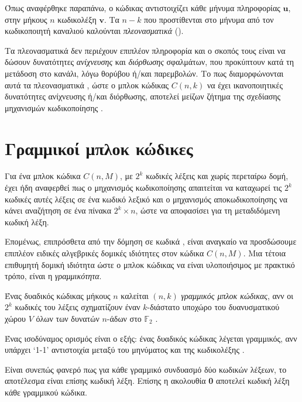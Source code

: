 Όπως αναφέρθηκε παραπάνω, ο κώδικας αντιστοιχίζει κάθε μήνυμα πληροφορίας $\mathbf{u}$, στην μήκους $n$ κωδικολέξη $\mathbf{v}$. Tα $n-k$  που προστίθενται στο μήνυμα από τον κωδικοποιητή καναλιού καλούνται \textit{πλεονασματικά} (). 

Τα πλεονασματικά  δεν περιέχουν επιπλέον πληροφορία και ο σκοπός τους είναι να δώσουν δυνατότητες \textit{ανίχνευσης} και \textit{διόρθωσης} σφαλμάτων, που προκύπτουν κατά τη μετάδοση στο κανάλι, λόγω θορύβου ή/και παρεμβολών. Το πως διαμορφώνονται αυτά τα πλεονασματικά , ώστε ο μπλοκ κώδικας $C(n,k)$ να έχει ικανοποιητικές δυνατότητες ανίχνευσης ή/και διόρθωσης, αποτελεί μείζων ζήτημα της σχεδίασης μηχανισμών κωδικοποίησης \cite{ryan2009channel}.

\section{Γραμμικοί μπλοκ κώδικες}
Για ένα μπλοκ κώδικα $C(n,M)$, με $2^k$ κωδικές λέξεις και χωρίς περεταίρω δομή, έχει ήδη αναφερθεί πως ο μηχανισμός κωδικοποίησης απαιτείται να καταχωρεί τις $2^k$ κωδικές αυτές λέξεις σε ένα κωδικό λεξικό και ο μηχανισμός αποκωδικοποίησης να κάνει αναζήτηση σε ένα πίνακα $2^k\times{n}$, ώστε να αποφασίσει για τη μεταδιδόμενη κωδική λέξη. 

Επομένως, επιπρόσθετα από την δόμηση σε κωδικά , είναι αναγκαίο να προσδώσουμε επιπλέον ειδικές αλγεβρικές δομικές ιδιότητες στον κώδικα $C(n,M)$. Μια τέτοια επιθυμητή δομική ιδιότητα ώστε ο μπλοκ κώδικας να είναι υλοποιήσιμος με πρακτικό τρόπο, είναι η \textit{γραμμικότητα}.

\begin{definition}
Ένας δυαδικός κώδικας μήκους $n$ καλείται $(n,k)$ \textit{γραμμικός μπλοκ κώδικας}, ανν οι $2^k$ κωδικές του λέξεις σχηματίζουν έναν $k$-διάστατο υποχώρο του δυανυσματικού χώρου $V$ όλων των δυνατών $n$-άδων στο $\mathbb{F}_2$ \cite{ryan2009channel}.
\label{def:linear block code}
\end{definition}

Ένας ισοδύναμος ορισμός είναι ο εξής: ένας δυαδικός κώδικας λέγεται γραμμικός, ανν υπάρχει \enquote*{1-1} αντιστοιχία μεταξύ του μηνύματος  και της κωδικολέξης . 

Είναι συνεπώς φανερό πως για κάθε γραμμικό συνδυασμό δύο κωδικών λέξεων, το αποτέλεσμα είναι επίσης κωδική λέξη. Επίσης η ακολουθία \textbf{0} αποτελεί κωδική λέξη κάθε γραμμικού κώδικα.

